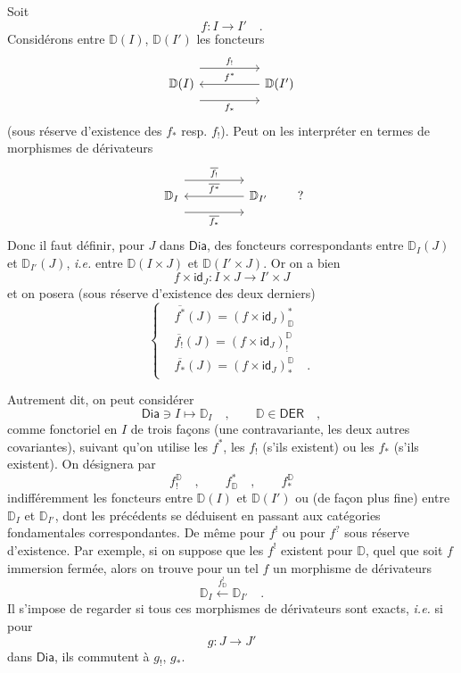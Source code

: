 \documentclass[11pt]{article}
\newcommand{\printedpage}[1]{\marginpar{\footnotesize p.~#1}}
\newcommand{\msp}[1]{\marginpar{\footnotesize [#1]}}
\newcommand{\D}{\mathbb{D}}
\newcommand{\Dia}{\mathsf{Dia}}
\newcommand{\DER}{\mathsf{DER}}
\newcommand{\id}{\mathsf{id}}
\begin{document}
\printedpage{15}

\msp{page 20}

Soit
\[
f : I \longrightarrow I' \quad .
\]
Considérons entre $\D(I)$, $\D(I')$ les foncteurs
\[
\begin{tikzcd}[column sep=huge]
\D(I) \arrow[r, shift left=3ex, "f_!"] \arrow[r, shift right=3ex, "f_*"'] & \D(I') \arrow[l, "f^*"']
\end{tikzcd}
\]
(sous réserve d'existence des $f_*$ resp. $f_!$). Peut on les interpréter en termes de morphismes de dérivateurs
\[
\begin{tikzcd}[column sep=huge]
\D_I \arrow[r, shift left=3ex, "\overline{f_!}"] \arrow[r, shift right=3ex, "\overline{f_*}"'] & \D_{I'} \arrow[l, "\overline{f^*}"']
\end{tikzcd}
\qquad ?
\]
Donc il faut définir, pour $J$ dans $\Dia$, des foncteurs correspondants entre $\D_I(J)$ et $\D_{I'}(J)$, \textit{i.e.} entre $\D(I \times J)$ et $\D(I' \times J)$. Or on a bien
\[
f \times \id_J : I \times J \longrightarrow I' \times J
\]
et on posera (sous réserve d'existence des deux derniers)
\[
\left\{
\begin{aligned}
&\overline{f^*}(J) = (f \times \id_J)^*_{\D} \\[1ex]
&\overline{f_!}(J) = (f \times \id_J)^{\D}_! \\[1ex]
&\overline{f_*}(J) = (f \times \id_J)^{\D}_* \quad .
\end{aligned}
\right.
\]

\msp{page 21}

Autrement dit, on peut considérer
\[
\Dia \ni I \longmapsto \D_I \quad , \qquad \D \in \DER \quad ,
\]
comme fonctoriel en $I$ de trois façons (une contravariante, les deux autres covariantes), suivant qu'on utilise les $f^*$, les $f_!$ (s'ils existent) ou les $f_*$ (s'ils existent). On désignera par
\[
f^{\D}_! \quad , \qquad f^*_{\D} \quad , \qquad f^{\D}_*
\]
indifféremment les foncteurs entre $\D(I)$ et $\D(I')$ ou (de façon plus fine) entre $\D_I$ et $\D_{I'}$, dont les précédents se déduisent en passant aux catégories fondamentales correspondantes. De même pour $f^!$ ou pour $f^?$ sous réserve d'existence. Par exemple, si on suppose que les $f^!$ existent pour $\D$, quel que soit $f$ immersion fermée, alors on trouve pour un tel $f$ un morphisme de dérivateurs
\[
\D_I \xleftarrow{f^!_{\D}} \D_{I'} \quad .
\]
Il s'impose de regarder si tous ces morphismes de dérivateurs sont exacts, \textit{i.e.} si pour
\[
g : J \longrightarrow J'
\]
dans $\Dia$, ils commutent à $g_!$, $g_*$.
\end{document}
